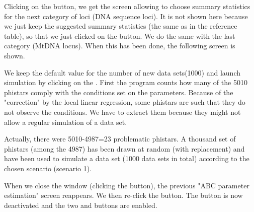 {%

\newpage
Clicking on the  button, we get the screen allowing to choose summary statistics for the next  category of loci (DNA sequence loci). It is not shown here because we just keep the suggested summary statistics (the same as in the reference table), so that we just clicked on the   button. We do the same with the last category (MtDNA locus). When this has been done, the following screen is shown.


We keep the default value for the number of new data sets(1000) and launch simulation by clicking on the . First the program counts how many of the 5010 phistars comply with the conditions set on the parameters. Because of the "correction" by the local linear regression, some phistars are such that they do not observe the conditions. We have to extract them because they might not allow a regular simulation of a data set.

Actually, there were 5010-4987=23 problematic phistars. A thousand set of phistars (among the 4987) has been drawn at random  (with replacement) and have been used to simulate a data set (1000 data sets in total) according to the chosen scenario (scenario 1).

\newpage

When we close the window (clicking the  button), the previous "ABC parameter estimation" screen reappears. We then re-click the  button. The button   is now deactivated and the two   and   buttons are enabled.

}

